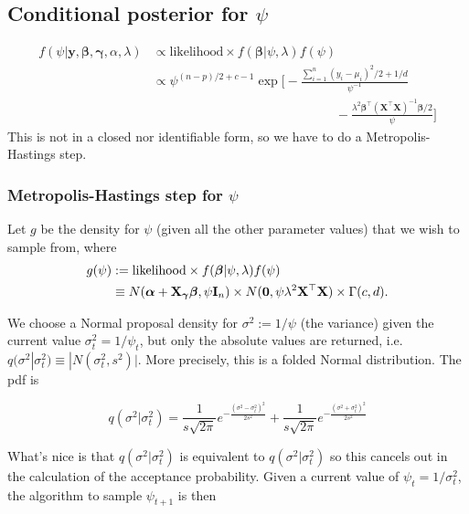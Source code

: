 \subsection{Conditional posterior for $\psi$}

\begin{align*}
	f(\psi|\mathbf y,\boldsymbol\beta, \boldsymbol\gamma, \alpha, \lambda)
	&\propto \text{likelihood}\times f(\boldsymbol\beta|\psi, \lambda)f(\psi) \\
	&\propto \psi^{(n-p)/2+c-1} \exp \Bigg[-\frac{\sum_{i=1}^n(y_i-\mu_i)^2/2 + 1/d}{\psi^{-1}} \\
	& \hspace{6cm} - \frac{\lambda^2 \boldsymbol\beta^\top (\mathbf X^\top \mathbf X)^{-1}\boldsymbol\beta/2}{\psi} \Bigg]
\end{align*}
This is not in a closed nor identifiable form, so we have to do a Metropolis-Hastings step.

\subsubsection{Metropolis-Hastings step for $\psi$}

Let $g$ be the density for $\psi$ (given all the other parameter values) that we wish to sample from, where
\begin{align*}
	g(\psi)
	&:= \text{likelihood}\times f(\boldsymbol\beta|\psi, \lambda)f(\psi) \\
	&\equiv N(\boldsymbol\alpha +  \mathbf X_{\boldsymbol\gamma} \boldsymbol\beta, \psi\mathbf I_n) \times 
	N(\mathbf 0, \psi\lambda^2 \mathbf X ^\top \mathbf X ) \times \Gamma(c,d).
\end{align*}

We choose a Normal proposal density for $\sigma^2:=1/\psi$ (the variance) given the current value $\sigma^2_t=1/\psi_t$, but only the absolute values are returned, i.e. $q(\sigma^2|\sigma^2_t) \equiv |N(\sigma^2_t, s^2)|$. More precisely, this is a folded Normal distribution. The pdf is

\[
	q(\sigma^2|\sigma^2_t) = \frac{1}{s\sqrt{2\pi}}e^{-\frac{(\sigma^2 - \sigma^2_t)^2}{2s^2}} + \frac{1}{s\sqrt{2\pi}}e^{-\frac{(\sigma^2 + \sigma^2_t)^2}{2s^2}}
\]

What's nice is that $q(\sigma^2|\sigma^2_t)$ is equivalent to $q(\sigma^2|\sigma^2_t)$ so this cancels out in the calculation of the acceptance probability. Given a current value of $\psi_t=1/\sigma^2_t$, the algorithm to sample $\psi_{t+1}$ is then

